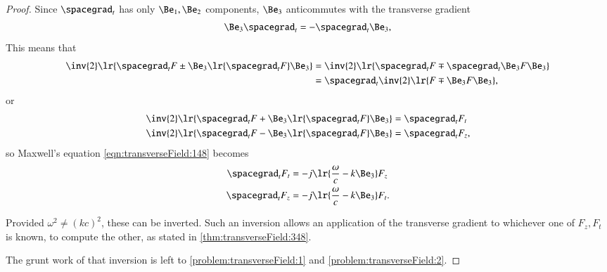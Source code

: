 \begin{proof}
Since \( \spacegrad_t \) has only \( \Be_1, \Be_2 \) components, \( \Be_3 \) anticommutes with the transverse gradient
\begin{equation}\label{eqn:transverseField:168}
\Be_3 \spacegrad_t = - \spacegrad_t \Be_3,
\end{equation}
This means that
\begin{equation}\label{eqn:transverseField:188}
\begin{aligned}
\inv{2} \lr{ \spacegrad_t F \pm \Be_3 \lr{ \spacegrad_t F } \Be_3 }
&=
\inv{2} \lr{ \spacegrad_t F \mp \spacegrad_t \Be_3 F \Be_3 } \\
&=
\spacegrad_t
\inv{2} \lr{ F \mp \Be_3 F \Be_3 },
\end{aligned}
\end{equation}
or
\begin{equation}\label{eqn:transverseField:208}
\begin{aligned}
\inv{2} \lr{ \spacegrad_t F + \Be_3 \lr{ \spacegrad_t F } \Be_3 } &= \spacegrad_t F_t \\
\inv{2} \lr{ \spacegrad_t F - \Be_3 \lr{ \spacegrad_t F } \Be_3 } &= \spacegrad_t F_z,
\end{aligned}
\end{equation}
so Maxwell's equation \cref{eqn:transverseField:148} becomes
\begin{equation}\label{eqn:transverseField:228}
\begin{aligned}
\spacegrad_t F_t &= - j \lr{ \frac{\omega}{c} - k \Be_3 } F_z \\
\spacegrad_t F_z &= - j \lr{ \frac{\omega}{c} - k \Be_3 } F_t.
\end{aligned}
\end{equation}

Provided \( \omega^2 \ne (k c)^2 \), these can be inverted.
Such an inversion allows an application of the transverse gradient to whichever one
of \( F_z, F_t \) is known, to compute the other, as stated in
\cref{thm:transverseField:348}.

The grunt work of that inversion is left to \cref{problem:transverseField:1} and \cref{problem:transverseField:2}.
\end{proof}
